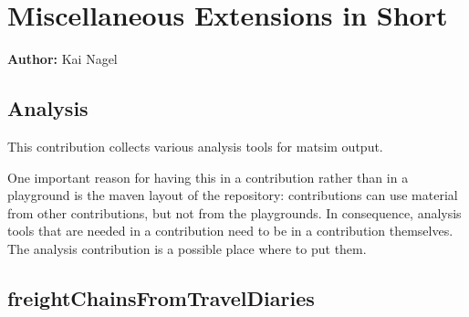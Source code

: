 \chapter{Miscellaneous Extensions in Short}
\label{ch:misccontribs}

\hfill \textbf{Author:} Kai Nagel


\section{Analysis}
\label{sec:contrib-analysis}





This \gls{contribution} collects various analysis tools for \gls{matsim} output.  

One important reason for having this in a \gls{contribution} rather than in a playground is the \gls{maven} layout of the repository: \Glspl{contribution} can use material from other \glspl{contribution}, but not from the playgrounds. 
In consequence, analysis tools that are needed in a \gls{contribution} need to be in a \gls{contribution} themselves. 
The analysis \gls{contribution} is a possible place where to put them.

\section{freightChainsFromTravelDiaries}
\label{sec:freightChainsFromTravelDiaries}

